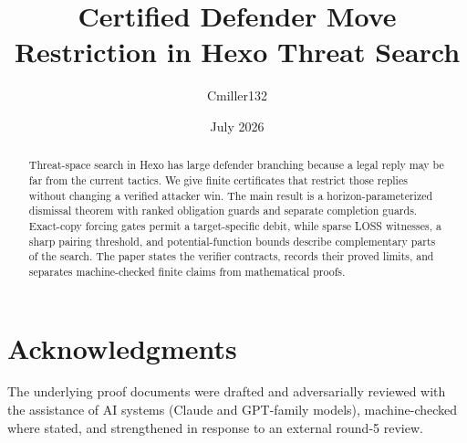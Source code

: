 \documentclass[11pt,letterpaper,onecolumn]{article}
\title{Certified Defender Move Restriction in Hexo Threat Search}
\author{Cmiller132}
\date{July 2026}
\begin{document}
\maketitle

\begin{abstract}
Threat-space search in Hexo has large defender branching because a legal
reply may be far from the current tactics.  We give finite certificates that
restrict those replies without changing a verified attacker win.  The main
result is a horizon-parameterized dismissal theorem with ranked obligation
guards and separate completion guards.  Exact-copy forcing gates permit a
target-specific debit, while sparse LOSS witnesses, a sharp pairing threshold,
and potential-function bounds describe complementary parts of the search.
The paper states the verifier contracts, records their proved limits, and
separates machine-checked finite claims from mathematical proofs.
\end{abstract}

\tableofcontents















\appendix


\section*{Acknowledgments}
The underlying proof documents were drafted and adversarially reviewed with the assistance of AI systems (Claude and GPT-family models), machine-checked where stated, and strengthened in response to an external round-5 review.



\end{document}
